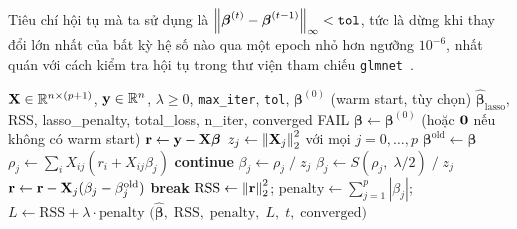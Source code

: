 Tiêu chí hội tụ mà ta sử dụng là $\left\lVert\boldsymbol{\beta}^{(t)} - \boldsymbol{\beta}^{(t-1)}\right\rVert_\infty < \texttt{tol}$,
tức là dừng khi thay đổi lớn nhất của bất kỳ hệ số nào qua một epoch nhỏ hơn ngưỡng
$10^{-6}$, nhất quán với cách kiểm tra hội tụ trong thư viện tham chiếu
\texttt{glmnet}~\cite{friedman2010}.

\begin{algorithm}[H]
\caption{Lasso Regression via Coordinate Descent (\texttt{lasso\_fit})}
\label{alg:lasso_fit}
\begin{algorithmic}[1]
\Require $\mathbf{X} \in \mathbb{R}^{n\times(p+1)}$, $\mathbf{y} \in \mathbb{R}^n$, $\lambda \geq 0$,
         \texttt{max\_iter}, \texttt{tol}, $\boldsymbol{\beta}^{(0)}$ (warm start, tùy chọn)
\Ensure $\hat{\boldsymbol{\beta}}_{\text{lasso}}$, RSS, lasso\_penalty, total\_loss, n\_iter, converged
    \State \Return \textsc{FAIL} 
\EndIf
\State $\boldsymbol{\beta} \gets \boldsymbol{\beta}^{(0)}$ (hoặc $\mathbf{0}$ nếu không có warm start)
\State $\mathbf{r} \gets \mathbf{y} - \mathbf{X}\boldsymbol{\beta}$ 
\State $z_j \gets \left\lVert\mathbf{X}_j\right\rVert_2^2$ với mọi $j = 0,\ldots,p$ 
    \State $\boldsymbol{\beta}^{\text{old}} \gets \boldsymbol{\beta}$
        \State $\rho_j \gets \sum_{i} X_{ij}(r_i + X_{ij}\beta_j)$
            \State \textbf{continue} 
        \EndIf
            \State $\beta_j \gets \rho_j \;/\; z_j$
        \Else
            \State $\beta_j \gets S\!\left(\rho_j,\;\lambda/2\right) \;/\; z_j$
        \EndIf
        \State $\mathbf{r} \gets \mathbf{r} - \mathbf{X}_j(\beta_j - \beta_j^{\text{old}})$
    \EndFor
        \State \textbf{break} 
    \EndIf
\EndFor
\State $\text{RSS} \gets \left\lVert\mathbf{r}\right\rVert_2^2$;\quad
       $\text{penalty} \gets \sum_{j=1}^p|\beta_j|$;\quad
       $L \gets \text{RSS} + \lambda\cdot\text{penalty}$
\State \Return $\bigl(\hat{\boldsymbol{\beta}},\;\text{RSS},\;\text{penalty},\;L,\;t,\;\text{converged}\bigr)$
\end{algorithmic}
\end{algorithm}

